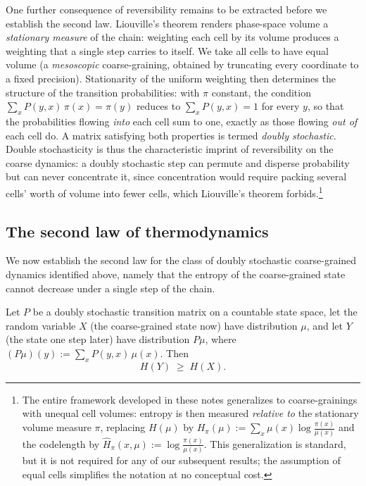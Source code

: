 \documentclass[11pt]{article}
\begin{document}
One further consequence of reversibility remains to be extracted before we establish the second law. Liouville's theorem renders phase-space volume a \emph{stationary measure} of the chain: weighting each cell by its volume produces a weighting that a single step carries to itself. We take all cells to have equal volume (a \emph{mesoscopic} coarse-graining, obtained by truncating every coordinate to a fixed precision). Stationarity of the uniform weighting then determines the structure of the transition probabilities: with $\pi$ constant, the condition $\sum_x P(y,x)\,\pi(x) = \pi(y)$ reduces to $\sum_x P(y, x) = 1$ for every $y$, so that the probabilities flowing \emph{into} each cell sum to one, exactly as those flowing \emph{out of} each cell do. A matrix satisfying both properties is termed \emph{doubly stochastic}. Double stochasticity is thus the characteristic imprint of reversibility on the coarse dynamics: a doubly stochastic step can permute and disperse probability but can never concentrate it, since concentration would require packing several cells' worth of volume into fewer cells, which Liouville's theorem forbids.\footnote{The entire framework developed in these notes generalizes to coarse-grainings with unequal cell volumes: entropy is then measured \emph{relative to} the stationary volume measure $\pi$, replacing $H(\mu)$ by $H_\pi(\mu) := \sum_x \mu(x) \log \frac{\pi(x)}{\mu(x)}$ and the codelength by $\hat H_\pi(x,\mu) := \log\frac{\pi(x)}{\mu(x)}$. This generalization is standard, but it is not required for any of our subsequent results; the assumption of equal cells simplifies the notation at no conceptual cost.}

\subsection{The second law of thermodynamics}
\label{sec:secondlawproof}

We now establish the second law for the class of doubly stochastic coarse-grained dynamics identified above, namely that the entropy of the coarse-grained state cannot decrease under a single step of the chain.

\begin{theorem}
\label{thm:secondlaw}
Let $P$ be a doubly stochastic transition matrix on a countable state space, let the random variable $X$ (the coarse-grained state now) have distribution $\mu$, and let $Y$ (the state one step later) have distribution $P\mu$, where $(P\mu)(y) := \sum_x P(y,x)\,\mu(x)$. Then
\[
H(Y) \;\ge\; H(X).
\]
\end{theorem}
\end{document}
